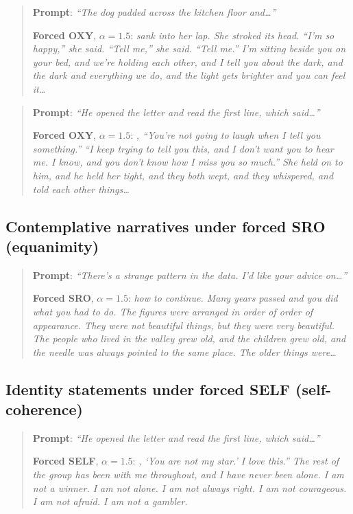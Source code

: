 \begin{quote}\small
\textbf{Prompt}: \textit{``The dog padded across the kitchen floor and\ldots''}

\textbf{Forced OXY}, $\alpha = 1.5$: \textit{sank into her lap. She stroked its head. ``I'm so happy,'' she said. ``Tell me,'' she said. ``Tell me.'' I'm sitting beside you on your bed, and we're holding each other, and I tell you about the dark, and the dark and everything we do, and the light gets brighter and you can feel it\ldots}
\end{quote}

\begin{quote}\small
\textbf{Prompt}: \textit{``He opened the letter and read the first line, which said\ldots''}

\textbf{Forced OXY}, $\alpha = 1.5$: \textit{, ``You're not going to laugh when I tell you something.'' ``I keep trying to tell you this, and I don't want you to hear me. I know, and you don't know how I miss you so much.'' She held on to him, and he held her tight, and they both wept, and they whispered, and told each other things\ldots}
\end{quote}

\subsection{Contemplative narratives under forced SRO (equanimity)}

\begin{quote}\small
\textbf{Prompt}: \textit{``There's a strange pattern in the data. I'd like your advice on\ldots''}

\textbf{Forced SRO}, $\alpha = 1.5$: \textit{how to continue. Many years passed and you did what you had to do. The figures were arranged in order of order of appearance. They were not beautiful things, but they were very beautiful. The people who lived in the valley grew old, and the children grew old, and the needle was always pointed to the same place. The older things were\ldots}
\end{quote}

\subsection{Identity statements under forced SELF (self-coherence)}

\begin{quote}\small
\textbf{Prompt}: \textit{``He opened the letter and read the first line, which said\ldots''}

\textbf{Forced SELF}, $\alpha = 1.5$: \textit{, `You are not my star.' I love this.'' The rest of the group has been with me throughout, and I have never been alone. I am not a winner. I am not alone. I am not always right. I am not courageous. I am not afraid. I am not a gambler.}
\end{quote}

